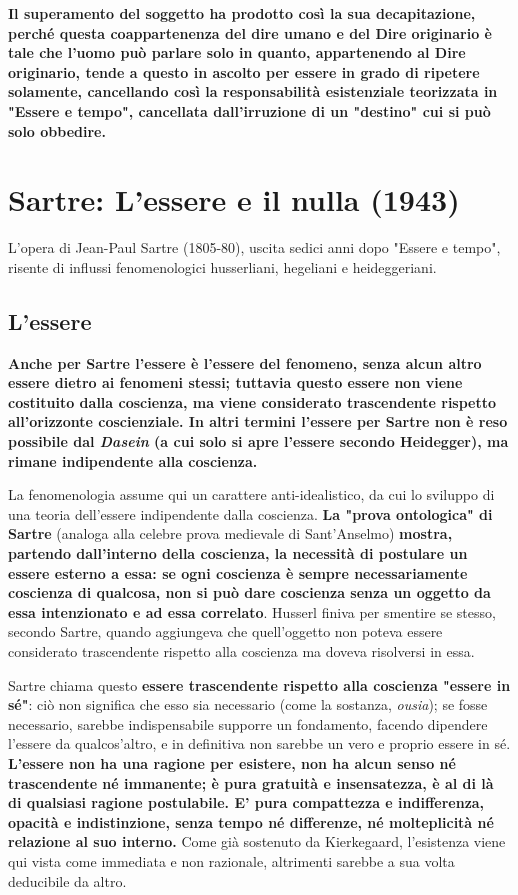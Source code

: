 \textbf{Il superamento del soggetto ha prodotto così la
sua decapitazione, perché questa coappartenenza
del dire umano e del Dire originario è
tale che l'uomo può parlare solo in quanto,
appartenendo al Dire originario, tende
a questo in ascolto per essere in grado
di ripetere solamente, cancellando così
la responsabilità esistenziale teorizzata in
"Essere e tempo", cancellata dall'irruzione
di un "destino" cui si può solo obbedire.}

\section{Sartre: L'essere e il nulla (1943)}


L'opera di  Jean-Paul Sartre (1805-80), uscita sedici anni dopo
"Essere e tempo", risente di influssi fenomenologici husserliani,
hegeliani e heideggeriani.

\subsection{L'essere}

\textbf{Anche per Sartre l'essere è l'essere del fenomeno,
senza alcun altro essere dietro ai fenomeni stessi;
tuttavia questo essere non viene costituito dalla
coscienza, ma viene considerato trascendente rispetto
all'orizzonte coscienziale. In altri termini
l'essere per Sartre non è reso possibile dal
\textit{Dasein} (a cui solo si apre l'essere secondo Heidegger),
ma rimane indipendente alla coscienza.}

La fenomenologia assume qui un carattere
anti-idealistico, da cui lo sviluppo di una teoria
dell'essere indipendente dalla coscienza.
\textbf{La "prova ontologica" di Sartre} (analoga alla
celebre prova medievale di Sant'Anselmo)\textbf{ mostra, partendo dall'interno
della coscienza, la necessità di postulare un
essere esterno a essa: se ogni coscienza è sempre
necessariamente coscienza di qualcosa,
non si può dare coscienza senza un oggetto da essa
intenzionato e ad essa correlato}. Husserl finiva
per smentire se stesso, secondo Sartre, quando
aggiungeva che quell'oggetto non poteva essere considerato trascendente rispetto alla coscienza ma doveva
risolversi in essa.

Sartre chiama questo \textbf{essere trascendente rispetto
alla coscienza "essere in sé"}: ciò non significa
che esso sia necessario (come la sostanza, \textit{ousia});
se fosse necessario, sarebbe indispensabile supporre
un fondamento, facendo dipendere l'essere da qualcos'altro, e in
definitiva non sarebbe un vero e proprio essere in sé.
\textbf{L'essere non ha una ragione per esistere, non
ha alcun senso né trascendente né immanente;
è pura gratuità e insensatezza, è al di là di
qualsiasi ragione postulabile. E' pura compattezza
e indifferenza, opacità e indistinzione, senza tempo
né differenze, né molteplicità né relazione al suo interno.}
Come già sostenuto da Kierkegaard, l'esistenza viene qui vista come immediata e non razionale, altrimenti sarebbe a sua volta deducibile da altro.

